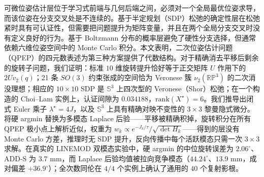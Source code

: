可微位姿估计层位于学习式前端与几何后端之间，必须对一个全局最优位姿求导，而该位姿在分支交叉处是不连续的。基于半定规划（SDP）松弛的确定性层在松弛紧时具有可认证性，但需要把问题提升为矩阵变量，并且在两个全局分支交叉时没有定义良好的行为。基于 Boltzmann 分布的概率层避免了硬性分支选择，但通常依赖六维位姿空间中的 Monte Carlo 积分。本文表明，二次位姿估计问题（QPEP）的四元数表述为第三种方案提供了代数结构。对于精确消去平移后剩余的旋转子问题，我们证明：标准 $10$ 维旋转提升恰好等于正交矩阵 $U$ 作用下的 $2Uv_2(q)$；21 条 $SO(3)$ 约束张成的空间恰为 Veronese 簇 $\nu_2(\mathbb{RP}^3)$ 的二次消没理想；相应的 $10\times10$ SDP 是 $\mathbb{S}^3$ 上四次型的 Veronese（Shor）松弛；在一个构造的 Choi--Lam 实例上，认证间隙为 $0.034188$，$\mathrm{rank}(X^\star)=6$。我们推导出闭式 Euler 乘子 $\lambda^\star=4J$，以及 $\mathbb{S}^3$ 上具有精确对映不变性的 $3\times3$ 黎曼隐式微分。将硬 argmin 替换为多模态 Laplace 后验——平移被精确积掉，旋转积分在所有 QPEP 极小点上解析近似，权重为 $w_k\propto e^{-J_k/\tau}/\sqrt{\det H_k}$——得到的层没有 Monte Carlo 方差，推理时无 SDP 提升，反向传播中每个活跃模态只需一次 $3\times3$ 求解。在真实的 LINEMOD 双模态实验中，硬 argmin 的中位旋转误差为 $2.06^\circ$、ADD-S 为 $3.7$ mm，而 Laplace 后验均值被拉向竞争模态（$44.24^\circ$、$13.9$ mm，成对偏差 $+36.9^\circ$）；全次数同伦在 $4/4$ 个实例上确认了通用的 $40$ 个复射影根。
